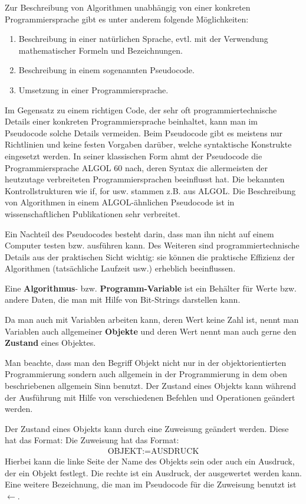 \begin{bem} 
Zur Beschreibung von Algorithmen unabhängig von einer konkreten Programmiersprache gibt es unter anderem folgende Möglichkeiten: 
\begin{enumerate}
	\item Beschreibung in einer natürlichen Sprache, evtl. mit der Verwendung mathematischer Formeln und Bezeichnungen. 
	\item Beschreibung in einem sogenannten Pseudocode. 
	\item Umsetzung in einer Programmiersprache. 
\end{enumerate} 
Im Gegensatz zu einem richtigen Code, der sehr oft programmiertechnische Details einer konkreten Programmiersprache beinhaltet, kann man im Pseudocode solche Details vermeiden. Beim Pseudocode gibt es meistens nur Richtlinien und keine festen Vorgaben darüber, welche syntaktische Konstrukte eingesetzt werden. In seiner klassischen Form ahmt der Pseudocode die Programmiersprache ALGOL 60 nach, deren Syntax die allermeisten der heutzutage verbreiteten Programmiersprachen beeinflusst hat. Die bekannten Kontrollstrukturen wie if, for usw.  stammen z.B. aus ALGOL. Die Beschreibung von Algorithmen in einem ALGOL-ähnlichen Pseudocode ist in wissenschaftlichen Publikationen sehr verbreitet. 

Ein Nachteil des Pseudocodes besteht darin, dass man ihn nicht auf einem Computer testen bzw. ausführen kann. Des Weiteren sind programmiertechnische Details aus der praktischen Sicht wichtig: sie können  die praktische Effizienz der Algorithmen (tatsächliche Laufzeit usw.) erheblich beeinflussen. 
\end{bem} 

\begin{defn} 
Eine \textbf{Algorithmus}- bzw. \textbf{Programm-Variable} ist ein Behälter für Werte bzw. andere Daten, die man mit Hilfe von Bit-Strings darstellen kann. 

Da man auch mit Variablen arbeiten kann, deren Wert keine Zahl ist, nennt man Variablen auch allgemeiner \textbf{Objekte} und deren Wert nennt man auch gerne den \textbf{Zustand} eines Objektes. 

Man beachte, dass man den Begriff Objekt nicht nur in der objektorientierten Programmierung sondern auch allgemein in der Programmierung in dem oben beschriebenen allgemein Sinn benutzt. Der Zustand eines Objekts kann während der Ausführung mit Hilfe von verschiedenen Befehlen und Operationen geändert werden. 

Der Zustand eines Objekts kann durch eine Zuweisung geändert werden. Diese hat das Format: 
Die Zuweisung hat das Format: 
\begin{align*}
	\text{OBJEKT} := \text{AUSDRUCK} 
\end{align*} 
Hierbei kann die linke Seite der Name des Objekts sein oder auch ein Ausdruck, der ein Objekt festlegt. Die rechte ist ein Ausdruck, der ausgewertet werden kann. Eine weitere Bezeichnung, die man im Pseudocode für die Zuweisung benutzt ist $\leftarrow$. 
\end{defn} 


